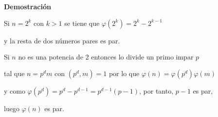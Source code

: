 \documentclass[a4paper,12pt]{report}
\newtheorem*{teo}{Teorema}
\newtheorem*{cor}{Corolario}
\newtheorem*{dfn}{Definición}
\begin{document}
\textbf{Demostración}

Si $n=2^k$ con $k>1$ se tiene que $\varphi(2^k)=2^k-2^{k-1}$ 

y la resta de dos números pares es par.

Si $n$ no es una potencia de 2 entonces lo divide un primo impar $p$ 

tal que $n=p^dm$ con $(p^d,m)=1$ por lo que $\varphi(n)=\varphi(p^d)\varphi(m)$ 

y como $\varphi(p^d)=p^d-p^{d-1}=p^{d-1}(p-1)$, por tanto, $p-1$ es par, 

luego  $\varphi(n)$ es par.


% 
% 
% 
% 
% 
% 
% 
% 
% 
% 
% 
% 
% 
% 
% 
% 
% 
% 
% 
% 
\end{document}
